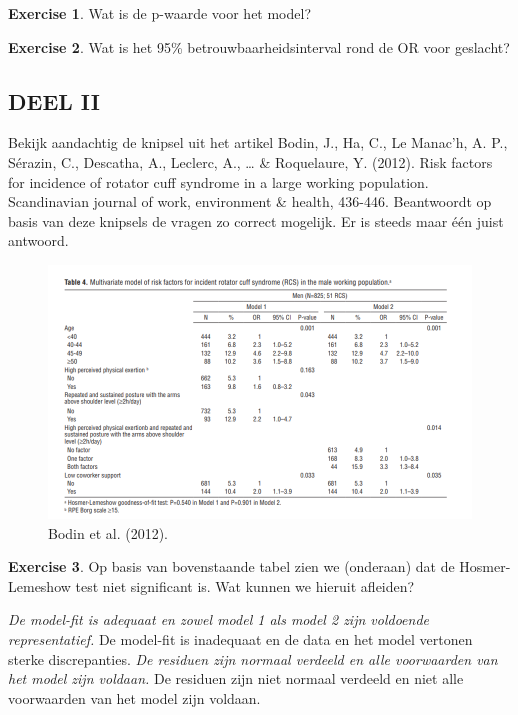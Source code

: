 \documentclass[
]{book}
\theoremstyle{definition}
\theoremstyle{definition}
\theoremstyle{definition}
\newtheorem{exercise}{Exercise}[chapter]
\theoremstyle{definition}
\theoremstyle{remark}
\begin{document}
\begin{exercise}
Wat is de p-waarde voor het model?
\end{exercise}

\begin{exercise}
Wat is het 95\% betrouwbaarheidsinterval rond de OR voor geslacht?
\end{exercise}

\hypertarget{deel-ii}{%
\subsection*{DEEL II}\label{deel-ii}}


Bekijk aandachtig de knipsel uit het artikel Bodin, J., Ha, C., Le Manac'h, A. P., Sérazin, C., Descatha, A., Leclerc, A., \ldots{} \& Roquelaure, Y. (2012). Risk factors for incidence of rotator cuff syndrome in a large working population. Scandinavian journal of work, environment \& health, 436-446. Beantwoordt op basis van deze knipsels de vragen zo correct mogelijk. Er is steeds maar één juist antwoord.

\begin{figure}
\includegraphics[width=0.9\linewidth]{img/exam_1} \caption{Bodin et al. (2012).}\label{fig:exam1}
\end{figure}

\begin{exercise}
Op basis van bovenstaande tabel zien we (onderaan) dat de Hosmer-Lemeshow test niet significant is. Wat kunnen we hieruit afleiden?

\emph{De model-fit is adequaat en zowel model 1 als model 2 zijn voldoende representatief. }De model-fit is inadequaat en de data en het model vertonen sterke discrepanties. \emph{De residuen zijn normaal verdeeld en alle voorwaarden van het model zijn voldaan. }De residuen zijn niet normaal verdeeld en niet alle voorwaarden van het model zijn voldaan.
\end{exercise}
\end{document}
